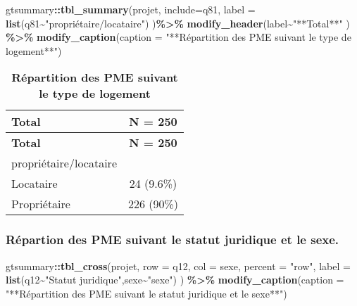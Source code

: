 \documentclass[
]{article}
\newenvironment{Shaded}{\begin{snugshade}}{\end{snugshade}}
\newcommand{\AttributeTok}[1]{\textcolor[rgb]{0.13,0.29,0.53}{#1}}
\newcommand{\FunctionTok}[1]{\textcolor[rgb]{0.13,0.29,0.53}{\textbf{#1}}}
\newcommand{\NormalTok}[1]{#1}
\newcommand{\SpecialCharTok}[1]{\textcolor[rgb]{0.81,0.36,0.00}{\textbf{#1}}}
\newcommand{\StringTok}[1]{\textcolor[rgb]{0.31,0.60,0.02}{#1}}
\begin{document}
\begin{Shaded}
\begin{Highlighting}[]
\NormalTok{gtsummary}\SpecialCharTok{::}\FunctionTok{tbl\_summary}\NormalTok{(projet, }\AttributeTok{include=}\NormalTok{q81, }\AttributeTok{label =} \FunctionTok{list}\NormalTok{(q81}\SpecialCharTok{\textasciitilde{}}\StringTok{"propriétaire/locataire"}\NormalTok{)}
\NormalTok{            )}\SpecialCharTok{\%\textgreater{}\%} \FunctionTok{modify\_header}\NormalTok{(label}\SpecialCharTok{\textasciitilde{}}\StringTok{"**Total**"}
\NormalTok{                               ) }\SpecialCharTok{\%\textgreater{}\%} 
  \FunctionTok{modify\_caption}\NormalTok{(}\AttributeTok{caption =} \StringTok{"**Répartition }
\StringTok{                 des PME suivant le type de logement**"}\NormalTok{)}
\end{Highlighting}
\end{Shaded}

\begin{longtable}[]{@{}lc@{}}
\caption{\textbf{Répartition des PME suivant le type de
logement}}\tabularnewline
\toprule\noalign{}
\textbf{Total} & \textbf{N = 250} \\
\midrule\noalign{}
\endfirsthead
\toprule\noalign{}
\textbf{Total} & \textbf{N = 250} \\
\midrule\noalign{}
\endhead
\bottomrule\noalign{}
\endlastfoot
propriétaire/locataire & \\
Locataire & 24 (9.6\%) \\
Propriétaire & 226 (90\%) \\
\end{longtable}

\hypertarget{ruxe9partion-des-pme-suivant-le-statut-juridique-et-le-sexe.}{%
\subsubsection{Répartion des PME suivant le statut juridique et le
sexe.}\label{ruxe9partion-des-pme-suivant-le-statut-juridique-et-le-sexe.}}

\begin{Shaded}
\begin{Highlighting}[]
\NormalTok{gtsummary}\SpecialCharTok{::}\FunctionTok{tbl\_cross}\NormalTok{(projet,}
    \AttributeTok{row =}\NormalTok{  q12,}
    \AttributeTok{col =}\NormalTok{ sexe,}
    \AttributeTok{percent =} \StringTok{"row"}\NormalTok{,}
    \AttributeTok{label =} \FunctionTok{list}\NormalTok{(q12}\SpecialCharTok{\textasciitilde{}}\StringTok{"Statut juridique"}\NormalTok{,sexe}\SpecialCharTok{\textasciitilde{}}\StringTok{"sexe"}\NormalTok{)}
\NormalTok{  ) }\SpecialCharTok{\%\textgreater{}\%} \FunctionTok{modify\_caption}\NormalTok{(}\AttributeTok{caption =} 
                         \StringTok{"**Répartition des PME suivant}
\StringTok{                       le statut juridique et le sexe**"}\NormalTok{) }
\end{Highlighting}
\end{Shaded}
\end{document}
